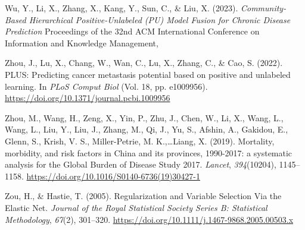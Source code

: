 \documentclass[10pt]{article}
\begin{document}
Wu, Y., Li, X., Zhang, X., Kang, Y., Sun, C., \& Liu, X. (2023).
\emph{Community-Based Hierarchical Positive-Unlabeled (PU) Model Fusion
for Chronic Disease Prediction} Proceedings of the 32nd ACM
International Conference on Information and Knowledge Management,

Zhou, J., Lu, X., Chang, W., Wan, C., Lu, X., Zhang, C., \& Cao, S.
(2022). PLUS: Predicting cancer metastasis potential based on positive
and unlabeled learning. In \emph{PLoS Comput Biol} (Vol. 18, pp.
e1009956). \url{https://doi.org/10.1371/journal.pcbi.1009956}

Zhou, M., Wang, H., Zeng, X., Yin, P., Zhu, J., Chen, W., Li, X., Wang,
L., Wang, L., Liu, Y., Liu, J., Zhang, M., Qi, J., Yu, S., Afshin, A.,
Gakidou, E., Glenn, S., Krish, V. S., Miller-Petrie, M. K.,\ldots Liang,
X. (2019). Mortality, morbidity, and risk factors in China and its
provinces, 1990-2017: a systematic analysis for the Global Burden of
Disease Study 2017. \emph{Lancet}, \emph{394}(10204), 1145--1158.
\url{https://doi.org/10.1016/S0140-6736(19)30427-1}

Zou, H., \& Hastie, T. (2005). Regularization and Variable Selection Via
the Elastic Net. \emph{Journal of the Royal Statistical Society Series
B: Statistical Methodology}, \emph{67}(2), 301--320.
\url{https://doi.org/10.1111/j.1467-9868.2005.00503.x}
\endgroup
\end{document}
